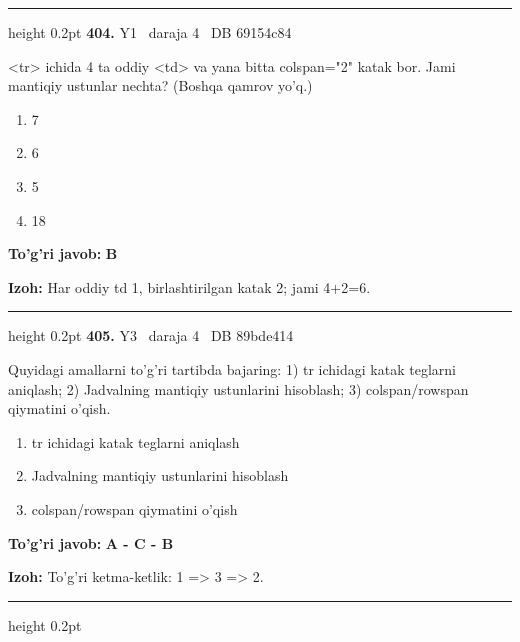 \documentclass[10pt,a4paper,oneside]{article}
\begin{document}
\vspace{2mm}\hrule height 0.2pt \vspace{4mm}
\hypertarget{q404}{\textbf{\color{ink}404.}}  {\color{muted}\scriptsize Y1 \textbullet\ daraja 4 \textbullet\ DB 69154c84}
\par
\textless{}tr\textgreater{} ichida 4 ta oddiy \textless{}td\textgreater{} va yana bitta colspan="2" katak bor. Jami mantiqiy ustunlar nechta? (Boshqa qamrov yo'q.)
\begin{enumerate}[label=\Alph*),leftmargin=9mm]
\item 7
\item 6
\item 5
\item 18
\end{enumerate}
\begin{tcolorbox}[enhanced,breakable,colback=teal!4,colframe=teal!45!black,boxrule=0.45pt,arc=1.2mm,left=2.8mm,right=2.8mm,top=2mm,bottom=2mm,before skip=2mm,after skip=2mm]
\textbf{\color{teal}To'g'ri javob:} \textbf{B}
\par\smallskip
\textbf{Izoh:} Har oddiy td 1, birlashtirilgan katak 2; jami 4+2=6.
\end{tcolorbox}
\vspace{2mm}\hrule height 0.2pt \vspace{4mm}
\hypertarget{q405}{\textbf{\color{ink}405.}}  {\color{muted}\scriptsize Y3 \textbullet\ daraja 4 \textbullet\ DB 89bde414}
\par
Quyidagi amallarni to'g'ri tartibda bajaring: 1) tr ichidagi katak teglarni aniqlash; 2) Jadvalning mantiqiy ustunlarini hisoblash; 3) colspan/rowspan qiymatini o'qish.
\begin{enumerate}[label=\Alph*),leftmargin=9mm]
\item tr ichidagi katak teglarni aniqlash
\item Jadvalning mantiqiy ustunlarini hisoblash
\item colspan/rowspan qiymatini o'qish
\end{enumerate}
\begin{tcolorbox}[enhanced,breakable,colback=teal!4,colframe=teal!45!black,boxrule=0.45pt,arc=1.2mm,left=2.8mm,right=2.8mm,top=2mm,bottom=2mm,before skip=2mm,after skip=2mm]
\textbf{\color{teal}To'g'ri javob:} \textbf{A - C - B}
\par\smallskip
\textbf{Izoh:} To'g'ri ketma-ketlik: 1 =\textgreater{} 3 =\textgreater{} 2.
\end{tcolorbox}
\vspace{2mm}\hrule height 0.2pt \vspace{4mm}
\end{document}
